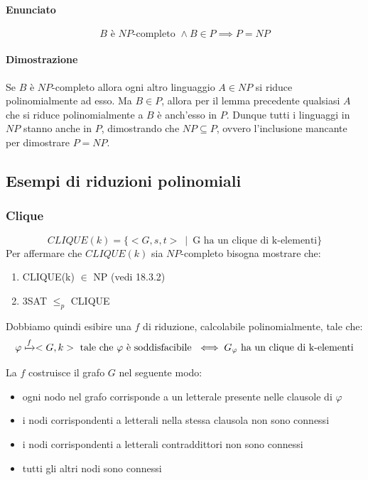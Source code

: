 \paragraph{Enunciato} 
\[
B \text{ è } NP\text{-completo } \land B \in P \implies P = NP
\]
\paragraph{Dimostrazione}

Se $B$ è $NP$-completo allora ogni altro linguaggio $A \in NP$ si riduce polinomialmente ad esso. Ma $B \in P$, allora per il lemma precedente qualsiasi $A$ che si riduce polinomialmente a $B$ è anch'esso in $P$. Dunque tutti i linguaggi in $NP$ stanno anche in $P$, dimostrando che $NP \subseteq P$, ovvero l'inclusione mancante per dimostrare $P = NP$.

\subsection{Esempi di riduzioni polinomiali}
\subsubsection{Clique}
\[
	CLIQUE(k) = \{ <G,s,t> \ \mid \ \text{G ha un clique di k-elementi} \}
\]	
Per affermare che $CLIQUE(k)$ sia $NP$-completo bisogna mostrare che:
\begin{enumerate}
    \item CLIQUE(k) $\in$ NP (vedi 18.3.2)
    \item 3SAT $\leq_{p}$ CLIQUE 
\end{enumerate}
Dobbiamo quindi esibire una $f$ di riduzione, calcolabile polinomialmente, tale che:
\[
	\varphi \xmapsto{f} <G,k> \text{ tale che } \varphi \text{ è soddisfacibile } \iff G_{\varphi} \text{ ha un clique di k-elementi}
\]

La $f$ costruisce il grafo $G$ nel seguente modo:
\begin{itemize}
	\item ogni nodo nel grafo corrisponde a un letterale presente nelle clausole di $\varphi$

	\item i nodi corrispondenti a letterali nella stessa clausola non sono connessi

	\item i nodi corrispondenti a letterali contraddittori non sono connessi

	\item tutti gli altri nodi sono connessi
\end{itemize}


